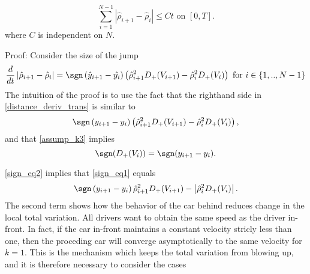 \begin{equation}
	\sum_{i=1}^{N-1} \left| \hat{\rho}_{i+1}-\hat{\rho}_{i} \right| \leq C t \text{ on } [0,T].
\end{equation} \label{TV_yhat}
where $C$ is independent on $N$. 

Proof: 
Consider the size of the jump 
\begin{align} \label{distance_deriv_trans}
	\frac{d}{dt} \left| \hat{\rho}_{i+1} - \hat{\rho}_{i} \right| = \sgn\left(\hat{y}_{i+1} - \hat{y_{i}}\right) \left(\hat{\rho}_{i+1}^2D_+(V_{i+1}) - \hat{\rho}_{i}^2 D_+(V_i)\right) \text{ for } i \in \{1,..,N-1\}
\end{align}
The intuition of the proof is to use the fact that the righthand side in \eqref{distance_deriv_trans} is similar to 
\begin{equation} \label{sign_eq1}
	\sgn\left(y_{i+1} - y_{i}\right) \left(\hat{\rho}_{i+1}^2 D_+(V_{i+1}) - \hat{\rho}_{i}^2 D_+(V_i)\right),
\end{equation}
and that \eqref{assump_k3} implies 
\begin{equation}\label{sign_eq2}
	\sgn(D_+(V_i)) = \sgn(y_{i+1} - y_i). 
\end{equation}

\eqref{sign_eq2} implies that \eqref{sign_eq1} equals
\begin{equation} \label{sign_eq3}
	\sgn\left(y_{i+1} - y_{i}\right)\hat{\rho}_{i+1}^2 D_+(V_{i+1}) - \left|\hat{\rho}_{i}^2 D_+(V_i)\right|.
\end{equation}
The second term shows how the behavior of the car behind reduces change in the local total variation. All drivers want to obtain the same speed as the driver in-front. In fact, if the car in-front maintains a constant velocity stricly less than one, then the proceding car will converge asymptotically to the same velocity for $k = 1$. This is the mechanism which keeps the total variation from blowing up, and it is therefore necessary to consider the cases

